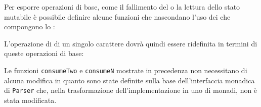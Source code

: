 Per esporre operazioni di base, come il fallimento del  o la lettura dello stato mutabile è possibile definire alcune funzioni che nascondano l'uso dei  che compongono lo :

L'operazione di  di un singolo carattere dovrà quindi essere ridefinita in termini di queste operazioni di base:

Le funzioni \lstinline{consumeTwo} e \lstinline{consumeN} mostrate in precedenza non necessitano di alcuna modifica in quanto sono state definite sulla base dell'interfaccia monadica di \lstinline{Parser} che, nella trasformazione dell'implementazione in uno  di monadi, non è stata modificata.
